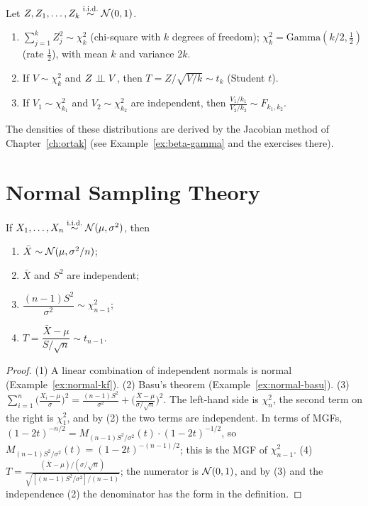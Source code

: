 \documentclass[main.tex]{subfiles}
\begin{document}
\begin{definition}\label{def:orneklem-dag}
Let $Z,Z_1,\dots,Z_k\overset{\text{i.i.d.}}{\sim}\mathcal{N}(0,1)$.
\begin{enumerate}
  \item $\sum_{j=1}^kZ_j^2\sim\chi^2_k$ (chi-square with $k$ degrees of freedom); $\chi^2_k=\text{Gamma}(k/2,\tfrac12)$ (rate $\tfrac12$), with mean $k$ and variance $2k$.
  \item If $V\sim\chi^2_k$ and $Z\perp\!\!\!\perp V$, then $T=Z/\sqrt{V/k}\sim t_k$ (Student $t$).
  \item If $V_1\sim\chi^2_{k_1}$ and $V_2\sim\chi^2_{k_2}$ are independent, then $\frac{V_1/k_1}{V_2/k_2}\sim F_{k_1,k_2}$.
\end{enumerate}
The densities of these distributions are derived by the Jacobian method of Chapter~\ref{ch:ortak} (see Example~\ref{ex:beta-gamma} and the exercises there).
\end{definition}

\section{Normal Sampling Theory}

\begin{theorem}\label{thm:normal-orneklem}
If $X_1,\dots,X_n\overset{\text{i.i.d.}}{\sim}\mathcal{N}(\mu,\sigma^2)$, then
\begin{enumerate}
  \item $\bar X\sim\mathcal{N}(\mu,\sigma^2/n)$;
  \item $\bar X$ and $S^2$ are independent;
  \item $\dfrac{(n-1)S^2}{\sigma^2}\sim\chi^2_{n-1}$;
  \item $T=\dfrac{\bar X-\mu}{S/\sqrt n}\sim t_{n-1}$.
\end{enumerate}
\end{theorem}
\begin{proof}
(1) A linear combination of independent normals is normal (Example~\ref{ex:normal-kf}).
(2) Basu's theorem (Example~\ref{ex:normal-basu}).
(3) $\sum_{i=1}^n\big(\frac{X_i-\mu}{\sigma}\big)^2=\frac{(n-1)S^2}{\sigma^2}+\big(\frac{\bar X-\mu}{\sigma/\sqrt n}\big)^2$. The left-hand side is $\chi^2_n$, the second term on the right is $\chi^2_1$, and by (2) the two terms are independent. In terms of MGFs, $(1-2t)^{-n/2}=M_{(n-1)S^2/\sigma^2}(t)\cdot(1-2t)^{-1/2}$, so $M_{(n-1)S^2/\sigma^2}(t)=(1-2t)^{-(n-1)/2}$; this is the MGF of $\chi^2_{n-1}$.
(4) $T=\frac{(\bar X-\mu)/(\sigma/\sqrt n)}{\sqrt{[(n-1)S^2/\sigma^2]/(n-1)}}$; the numerator is $\mathcal{N}(0,1)$, and by (3) and the independence (2) the denominator has the form in the definition.
\end{proof}
\end{document}
